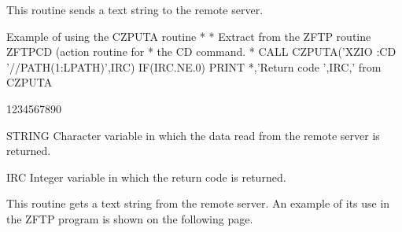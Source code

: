 \par
This routine sends a text string to the remote server.
\begin{XMPt}{Example of using the CZPUTA routine}
*
*     Extract from the ZFTP routine ZFTPCD (action routine for
*     the CD command.
*
      CALL CZPUTA('XZIO :CD '//PATH(1:LPATH)',IRC)
      IF(IRC.NE.0) PRINT *,'Return code ',IRC,' from CZPUTA
\end{XMPt}
\begin{DLtt}{1234567890}
\item[STRING]Character variable in which the data read from the remote server is
returned.
\item[IRC]Integer variable in which the return code is returned.
\end{DLtt}
\par
This routine gets a text string from the remote server.
An example of its use in the ZFTP program is shown on the following
page.

